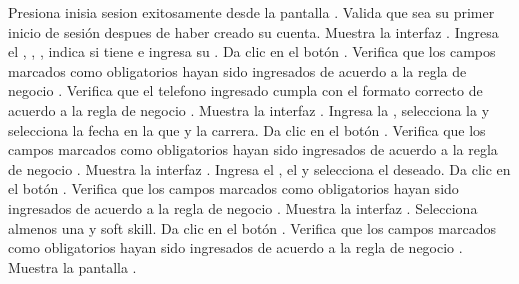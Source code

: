 \begin{UCtrayectoria}
	\UCpaso [\UCactor] Presiona inisia sesion exitosamente desde la pantalla .
    \UCpaso [\UCsist] Valida que sea su primer inicio de sesión despues de haber creado su cuenta.
	\UCpaso [\UCsist] Muestra la interfaz .
	\UCpaso [\UCactor] Ingresa el , , , 
	indica si tiene  e ingresa su .\label{cu07-grl1}
	\UCpaso [\UCactor] Da clic en el botón .
	\UCpaso [\UCsist] Verifica que los campos marcados como obligatorios hayan sido ingresados de acuerdo a la
	regla de negocio .
	\UCpaso [\UCsist] Verifica que el telefono ingresado cumpla con el formato correcto de acuerdo a la regla de negocio  .  
	\UCpaso [\UCsist] Muestra la interfaz .
	\UCpaso [\UCactor] Ingresa la , selecciona la  y selecciona
	la fecha en la que  y  la carrera.
	\UCpaso [\UCactor] Da clic en el botón .
	\UCpaso [\UCsist] Verifica que los campos marcados como obligatorios hayan sido ingresados de acuerdo a la
	regla de negocio .\label{cu07-grl2} 
	\UCpaso [\UCsist] Muestra la interfaz .
	\UCpaso [\UCactor] Ingresa el  , el  y selecciona
	el   deseado.
	\UCpaso [\UCactor] Da clic en el botón .
	\UCpaso [\UCsist] Verifica que los campos marcados como obligatorios hayan sido ingresados de acuerdo a la
	regla de negocio .\label{cu07-grl3} 
	\UCpaso [\UCsist] Muestra la interfaz .
	\UCpaso [\UCactor] Selecciona almenos una  y soft skill.
	\UCpaso [\UCactor] Da clic en el botón .
	\UCpaso [\UCsist] Verifica que los campos marcados como obligatorios hayan sido ingresados de acuerdo a la
	regla de negocio .\label{cu07-grl4} 
	\UCpaso [\UCsist] Muestra la pantalla . %
\end{UCtrayectoria}

